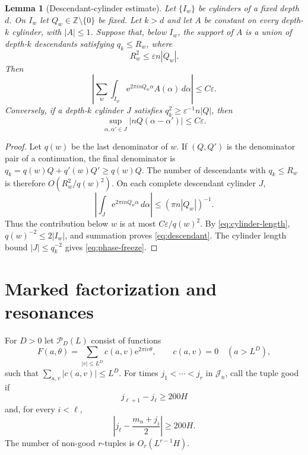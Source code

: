 \documentclass[11pt,a4paper]{amsart}
\newtheorem{lemma}[theorem]{Lemma}
\theoremstyle{definition}
\theoremstyle{remark}
\newcommand{\Z}{\mathbb Z}
\newcommand{\e}{\mathrm e}
\begin{document}
\begin{lemma}[Descendant-cylinder estimate]\label{lem:descendant}
Let $\{I_w\}$ be cylinders of a fixed depth $d$.  On $I_w$ let
$Q_w\in\Z\setminus\{0\}$ be fixed.  Let $k>d$ and let $A$ be constant on every
depth-$k$ cylinder, with $|A|\le1$.  Suppose that, below $I_w$, the support of
$A$ is a union of depth-$k$ descendants satisfying $q_k\le R_w$, where
\[
 R_w^2\le\varepsilon n|Q_w|.
\]
Then
\begin{equation}\label{eq:descendant}
 \left|\sum_w\int_{I_w}
       \e^{2\pi i nQ_w\alpha}A(\alpha)\,d\alpha\right|
 \le C\varepsilon.
\end{equation}
Conversely, if a depth-$k$ cylinder $J$ satisfies
$q_k^2\ge\varepsilon^{-1}n|Q|$, then
\begin{equation}\label{eq:phase-freeze}
 \sup_{\alpha,\alpha'\in J}|nQ(\alpha-\alpha')|
 \le C\varepsilon.
\end{equation}
\end{lemma}

\begin{proof}
Let $q(w)$ be the last denominator of $w$.  If $(Q,Q')$ is the denominator
pair of a continuation, the final denominator is
$q_k=q(w)Q+q'(w)Q'\ge q(w)Q$.  The number of descendants with
$q_k\le R_w$ is therefore $O(R_w^2/q(w)^2)$.  On each complete descendant
cylinder $J$,
\[
 \left|\int_J\e^{2\pi i nQ_w\alpha}\,d\alpha\right|
 \le(\pi n|Q_w|)^{-1}.
\]
Thus the contribution below $w$ is at most $C\varepsilon/q(w)^2$.  By
\eqref{eq:cylinder-length}, $q(w)^{-2}\le2|I_w|$, and summation proves
\eqref{eq:descendant}.  The cylinder length bound $|J|\le q_k^{-2}$ gives
\eqref{eq:phase-freeze}.
\end{proof}


\section{Marked factorization and resonances}

For $D>0$ let $\mathcal P_D(L)$ consist of functions
\begin{equation}\label{eq:one-time-poly}
 F(a,\theta)=\sum_{|v|\le L^D}c(a,v)\e^{2\pi iv\theta},
 \qquad c(a,v)=0\quad(a>L^D),
\end{equation}
such that $\sum_{a,v}|c(a,v)|\le L^D$.  For times
$j_1<\cdots<j_r$ in $\mathcal J_n$, call the tuple good if
\begin{equation}\label{eq:good-tuple-separation}
 j_{\ell+1}-j_\ell\ge200H
\end{equation}
and, for every $i<\ell$,
\begin{equation}\label{eq:good-tuple-resonance}
 \left|j_\ell-\frac{m_n+j_i}{2}\right|\ge200H.
\end{equation}
The number of non-good $r$-tuples is $O_r(L^{r-1}H)$.
\end{document}

